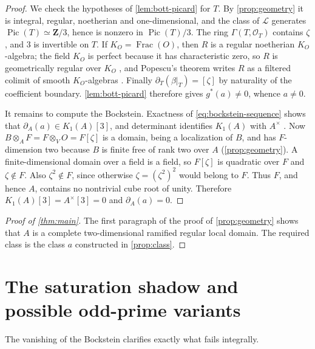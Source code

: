 \documentclass[10pt]{amsart}
\DeclareMathOperator{\Frac}{Frac}
\DeclareMathOperator{\Pic}{Pic}
\theoremstyle{remark}
\begin{document}
\begin{proof}
	We check the hypotheses of \cref{lem:bott-picard} for $T$.  By
	\cref{prop:geometry} it is integral, regular, noetherian and
	one-dimensional, and the class of $\mathcal L$ generates $\Pic(T)\simeq\mathbf Z/3$, hence is nonzero in $\Pic(T)/3$. The ring
	\(\Gamma(T,\mathcal O_T)\) contains \(\zeta\), and \(3\) is invertible
	on \(T\). If \(K_O=\Frac(O)\), then \(R\) is a
	regular noetherian $K_O$-algebra; the field $K_O$ is perfect because it
	has characteristic zero, so $R$ is geometrically regular over $K_O$
	\cite[Tags~05DU and~038V]{StacksProject}, and Popescu's theorem writes
	$R$ as a filtered colimit of smooth $K_O$-algebras
	\cite[Tag~07GC]{StacksProject}.  Finally
	$\partial_T(\beta|_T)=[\zeta]$ by naturality of the coefficient boundary.
	\cref{lem:bott-picard} therefore gives $g^*(a)\ne0$, whence $a\ne0$.
	
	
	It remains to compute the Bockstein.  Exactness of
	\eqref{eq:bockstein-sequence} shows that $\partial_A(a)\in K_1(A)[3]$,
	and determinant identifies \(K_1(A)\) with \(A^\times\)
	\cite[Lem.~III.1.4]{Weibel13KBook}.  Now
	\(
	B\otimes_A F=F\otimes_V O=F[\zeta]
	\)
	is a domain, being a localization of \(B\), and has \(F\)-dimension two
	because \(B\) is finite free of rank two over \(A\)
	(\cref{prop:geometry}).  A finite-dimensional domain over a field is a
	field, so \(F[\zeta]\) is quadratic over \(F\) and \(\zeta\notin F\).
	Also \(\zeta^2\notin F\), since otherwise
	\(\zeta=(\zeta^2)^2\) would belong to \(F\).  Thus \(F\), and hence
	\(A\), contains no nontrivial cube root of unity.  Therefore
	\(K_1(A)[3]=A^\times[3]=0\) and \(\partial_A(a)=0\).
	
	
	
\end{proof}




\begin{proof}[Proof of \cref{thm:main}]
The first paragraph of the proof of \cref{prop:geometry} shows that
\(A\) is a complete two-dimensional ramified regular local domain.
The required class is the class \(a\) constructed in
\cref{prop:class}.
\end{proof}


\section{The saturation shadow and possible odd-prime variants}

The vanishing of the Bockstein clarifies exactly what fails integrally.
\end{document}
